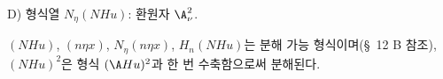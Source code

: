 
\noindent D) 형식열 $N_\eta(NHu)$: 환원자 $\A_\nu^2$.

$(NHu)$, $(n\eta x)$, $N_\eta(n\eta x)$, $H_n(NHu)$는 분해 가능 형식이며(\S\ 12 B 참조), $(NHu)^2$은 형식 $(\A Hu)^2$과 한 번 수축함으로써 분해된다.
